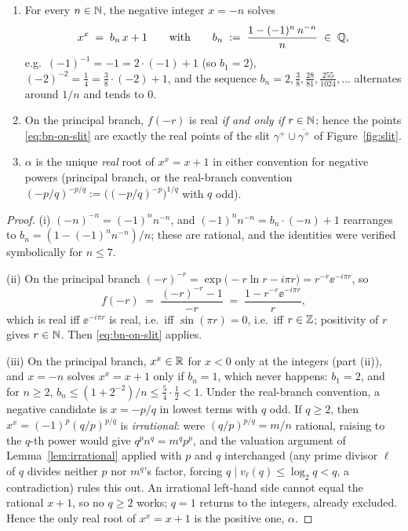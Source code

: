\begin{theorem}\label{thm:negroots}
\begin{enumerate}[label=\textup{(\roman*)}, leftmargin=2.4em]
\item For every $n \in \mathbb{N}$, the negative integer $x = -n$ solves
\[
    x^{x} \;=\; b_{n}\,x + 1
    \qquad\text{with}\qquad
    b_{n} \;:=\; \frac{1 - (-1)^{n}\, n^{-n}}{n} \;\in\; \mathbb{Q} ,
\]
e.g.\ $(-1)^{-1} = -1 = 2\cdot(-1) + 1$ (so $b_1 = 2$),
$(-2)^{-2} = \tfrac14 = \tfrac38 \cdot (-2) + 1$, and the sequence
$b_{n} = 2, \tfrac38, \tfrac{28}{81}, \tfrac{255}{1024}, \ldots$
alternates around $1/n$ and tends to $0$.
\item On the principal branch, $f(-r)$ is real \emph{if and only if}
$r \in \mathbb{N}$; hence the points \eqref{eq:bn-on-slit} are exactly the real
points of the slit $\gamma^{+} \cup \overline{\gamma^{+}}$ of
Figure~\ref{fig:slit}.
\item $\alpha$ is the unique \emph{real} root of $x^{x} = x + 1$ in
either convention for negative powers (principal branch, or the
real-branch convention $(-p/q)^{-p/q} := \bigl((-p/q)^{-p}\bigr)^{1/q}$
with $q$ odd).
\end{enumerate}
\end{theorem}

\begin{proof}
(i) $(-n)^{-n} = (-1)^{n} n^{-n}$, and
$(-1)^{n}n^{-n} = b_{n} \cdot (-n) + 1$ rearranges to
$b_{n} = (1 - (-1)^{n}n^{-n})/n$; these are rational, and the
identities were verified symbolically for $n \le 7$.

(ii) On the principal branch $(-r)^{-r} =
\exp\bigl(-r\ln r - i\pi r\bigr) = r^{-r}\ee^{-i\pi r}$, so
\[
    f(-r) \;=\; \frac{(-r)^{-r} - 1}{-r}
    \;=\; \frac{1 - r^{-r}\ee^{-i\pi r}}{r} ,
\]
which is real iff $\ee^{-i\pi r}$ is real, i.e.\ iff $\sin(\pi r) =
0$, i.e.\ iff $r \in \mathbb{Z}$; positivity of $r$ gives $r \in \mathbb{N}$. Then
\eqref{eq:bn-on-slit} applies.

(iii) On the principal branch, $x^{x} \in \mathbb{R}$ for $x < 0$ only at the
integers (part (ii)), and $x = -n$ solves $x^{x} = x + 1$ only if
$b_{n} = 1$, which never happens: $b_{1} = 2$, and for $n \ge 2$,
$b_{n} \le (1 + 2^{-2})/n \le \tfrac{5}{4}\cdot\tfrac12 < 1$. Under
the real-branch convention, a negative candidate is $x = -p/q$ in
lowest terms with $q$ odd. If $q \ge 2$, then
$x^{x} = (-1)^{p} (q/p)^{p/q}$ is \emph{irrational}: were
$(q/p)^{p/q} = m/n$ rational, raising to the $q$-th power would give
$q^{p} n^{q} = m^{q} p^{p}$, and the valuation argument of
Lemma~\ref{lem:irrational} applied with $p$ and $q$ interchanged (any
prime divisor $\ell$ of $q$ divides neither $p$ nor $m^{q}$'s factor,
forcing $q \mid v_\ell(q) \le \log_{2} q < q$, a contradiction)
rules this out. An irrational left-hand side cannot equal the rational
$x + 1$, so no $q \ge 2$ works; $q = 1$ returns to the integers,
already excluded. Hence the only real root of $x^{x} = x+1$ is the
positive one, $\alpha$.
\end{proof}

